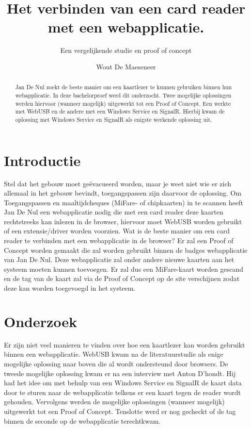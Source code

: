 \documentclass[a0,portrait]{hogent-poster}
\title{Het verbinden van een card reader met een webapplicatie.}
\subtitle{Een vergelijkende studie en proof of concept}
\author{Wout De Maeseneer}
\begin{document}
\maketitle

\begin{abstract}
Jan De Nul zoekt de beste manier om een kaartlezer te kunnen gebruiken binnen hun webapplicatie. In deze bachelorproef werd dit onderzocht. Twee mogelijke oplossingen werden hiervoor (wanneer mogelijk) uitgewerkt tot een Proof of Concept. Een werkte met WebUSB en de andere met een Windows Service en SignalR. Hierbij kwam de oplossing met Windows Service en SignalR als enigste werkende oplossing uit.
\end{abstract}

\begin{multicols}{2} %

\section{Introductie}

Stel dat het gebouw moet geëvacueerd worden, maar je weet niet wie er zich allemaal in het gebouw bevindt, toegangspassen zijn daarvoor de oplossing.
Om Toegangspassen en maaltijdcheques (MiFare- of chipkaarten) in te scannen heeft Jan De Nul een webapplicatie nodig die met een card reader deze kaarten rechtstreeks kan inlezen in de browser, hiervoor moet WebUSB worden gebruikt of een extensie/driver worden voorzien.
Wat is de beste manier om een card reader te verbinden met een webapplicatie in de browser? 
Er zal een Proof of Concept worden gemaakt die zal worden gebruikt binnen de badges webapplicatie van Jan De Nul. Deze webapplicatie zal onder andere nieuwe kaarten aan het systeem moeten kunnen toevoegen. Er zal dus een MiFare-kaart worden gescand en de tag van de kaart zal via de Proof of Concept op de site verschijnen zodat deze kan worden toegevoegd in het systeem.

\section{Onderzoek}
Er zijn niet veel manieren te vinden over hoe een kaartlezer kan worden gebruikt binnen een webapplicatie. WebUSB kwam na de literatuurstudie als enige mogelijke oplossing naar boven die al wordt ondersteund door browsers. De tweede mogelijke oplossing kwam er na een interview met Anton D'hondt. Hij had het idee om met behulp van een Windows Service en SignalR de kaart data door te sturen naar de webapplicatie telkens er een kaart tegen de reader wordt gehouden. Vervolgens werden de mogelijke oplossingen (wanneer mogelijk) uitgewerkt tot een Proof of Concept. Tenslotte werd er nog gecheckt of de tag binnen de seconde op de webapplicatie terechtkwam.


\end{multicols}
\end{document}
